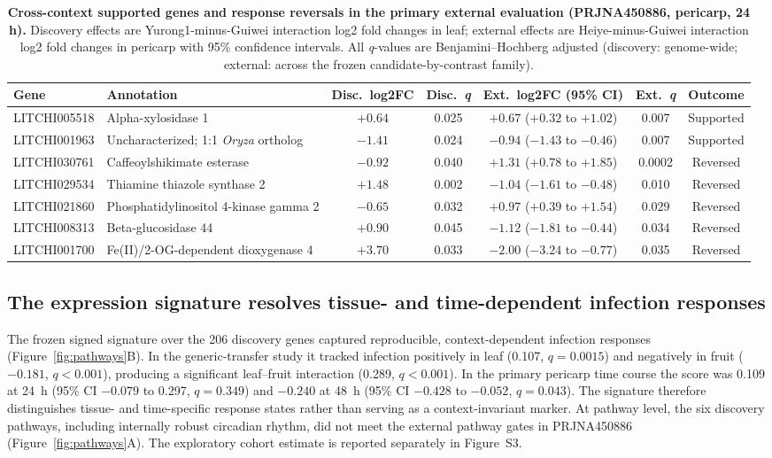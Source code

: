 \documentclass[11pt]{article}
\newcommand{\q}{\textit{q}}
\begin{document}
\begin{table}[p]
\centering
\caption{\textbf{Cross-context supported genes and response reversals in the primary external evaluation (PRJNA450886, pericarp, 24 h).} Discovery effects are Yurong1-minus-Guiwei interaction log2 fold changes in leaf; external effects are Heiye-minus-Guiwei interaction log2 fold changes in pericarp with 95\% confidence intervals. All \q-values are Benjamini--Hochberg adjusted (discovery: genome-wide; external: across the frozen candidate-by-contrast family).}
\label{tab:external}
\footnotesize
\setlength{\tabcolsep}{2.4pt}
\begin{tabular}{@{}llccccc@{}}
\toprule
\textbf{Gene} & \textbf{Annotation} & \textbf{Disc.\ log2FC} & \textbf{Disc.\ \q} & \textbf{Ext.\ log2FC (95\% CI)} & \textbf{Ext.\ \q} & \textbf{Outcome} \\
\midrule
LITCHI005518 & Alpha-xylosidase 1 & $+0.64$ & 0.025 & $+0.67$ ($+0.32$ to $+1.02$) & 0.007 & Supported \\
LITCHI001963 & Uncharacterized; 1:1 \textit{Oryza} ortholog & $-1.41$ & 0.024 & $-0.94$ ($-1.43$ to $-0.46$) & 0.007 & Supported \\
LITCHI030761 & Caffeoylshikimate esterase & $-0.92$ & 0.040 & $+1.31$ ($+0.78$ to $+1.85$) & 0.0002 & Reversed \\
LITCHI029534 & Thiamine thiazole synthase 2 & $+1.48$ & 0.002 & $-1.04$ ($-1.61$ to $-0.48$) & 0.010 & Reversed \\
LITCHI021860 & Phosphatidylinositol 4-kinase gamma 2 & $-0.65$ & 0.032 & $+0.97$ ($+0.39$ to $+1.54$) & 0.029 & Reversed \\
LITCHI008313 & Beta-glucosidase 44 & $+0.90$ & 0.045 & $-1.12$ ($-1.81$ to $-0.44$) & 0.034 & Reversed \\
LITCHI001700 & Fe(II)/2-OG-dependent dioxygenase 4 & $+3.70$ & 0.033 & $-2.00$ ($-3.24$ to $-0.77$) & 0.035 & Reversed \\
\bottomrule
\end{tabular}
\end{table}

\subsection{The expression signature resolves tissue- and time-dependent infection responses}

The frozen signed signature over the 206 discovery genes captured reproducible, context-dependent infection responses (Figure~\ref{fig:pathways}B). In the generic-transfer study it tracked infection positively in leaf (0.107, $\q=0.0015$) and negatively in fruit ($-0.181$, $\q<0.001$), producing a significant leaf--fruit interaction (0.289, $\q<0.001$). In the primary pericarp time course the score was 0.109 at 24~h (95\% CI $-0.079$ to 0.297, $\q=0.349$) and $-0.240$ at 48~h (95\% CI $-0.428$ to $-0.052$, $\q=0.043$). The signature therefore distinguishes tissue- and time-specific response states rather than serving as a context-invariant marker. At pathway level, the six discovery pathways, including internally robust circadian rhythm, did not meet the external pathway gates in PRJNA450886 (Figure~\ref{fig:pathways}A). The exploratory cohort estimate is reported separately in Figure~S3.
\end{document}
